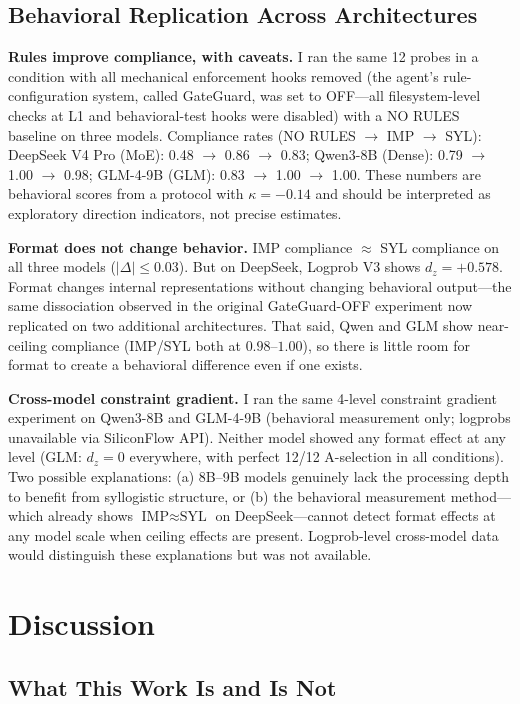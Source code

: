 \documentclass[11pt]{article}
\begin{document}
\subsection{Behavioral Replication Across Architectures}
\label{sec:crossmodel}

\textbf{Rules improve compliance, with caveats.} I ran the same 12 probes in a
condition with all mechanical enforcement hooks removed (the agent's
rule-configuration system, called GateGuard, was set to OFF---all
filesystem-level checks at L1 and behavioral-test hooks were disabled) with a
NO RULES baseline on three models. Compliance rates (NO RULES $\to$ IMP $\to$ SYL):
DeepSeek V4 Pro (MoE): 0.48 $\to$ 0.86 $\to$ 0.83; Qwen3-8B (Dense):
0.79 $\to$ 1.00 $\to$ 0.98; GLM-4-9B (GLM): 0.83 $\to$ 1.00 $\to$ 1.00.
These numbers are behavioral scores from a protocol with $\kappa=-0.14$ and
should be interpreted as exploratory direction indicators, not precise estimates.

\textbf{Format does not change behavior.} IMP compliance $\approx$ SYL compliance
on all three models ($|\Delta| \leq 0.03$). But on DeepSeek, Logprob V3 shows
$d_z=+0.578$. Format changes internal representations without changing behavioral
output---the same dissociation observed in the original GateGuard-OFF experiment
now replicated on two additional architectures. That said, Qwen and GLM show
near-ceiling compliance (IMP/SYL both at $0.98$--$1.00$), so there is little
room for format to create a behavioral difference even if one exists.

\textbf{Cross-model constraint gradient.} I ran the same 4-level constraint
gradient experiment on Qwen3-8B and GLM-4-9B (behavioral measurement only;
logprobs unavailable via SiliconFlow API). Neither model showed any format
effect at any level (GLM: $d_z=0$ everywhere, with perfect 12/12 A-selection
in all conditions). Two possible explanations: (a) 8B--9B models genuinely
lack the processing depth to benefit from syllogistic structure, or (b) the
behavioral measurement method---which already shows $\text{IMP}\approx\text{SYL}$
on DeepSeek---cannot detect format effects at any model scale when ceiling
effects are present. Logprob-level cross-model data would distinguish these
explanations but was not available.

\section{Discussion}

\subsection{What This Work Is and Is Not}
\end{document}
